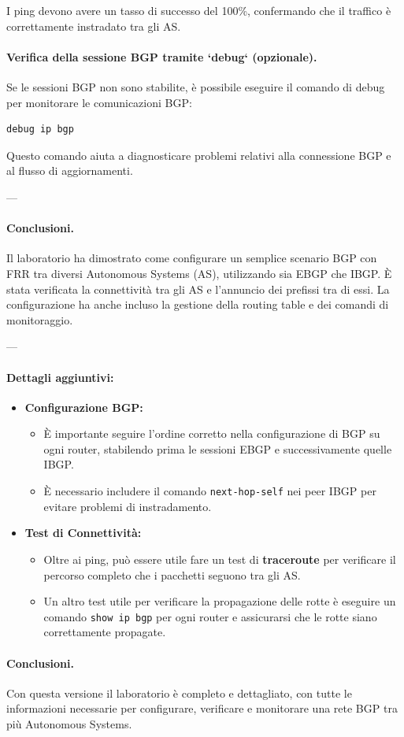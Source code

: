 I ping devono avere un tasso di successo del 100\%, confermando che il traffico è correttamente instradato tra gli AS.

\paragraph{Verifica della sessione BGP tramite `debug` (opzionale).}
Se le sessioni BGP non sono stabilite, è possibile eseguire il comando di debug per monitorare le comunicazioni BGP:
\begin{verbatim}
debug ip bgp
\end{verbatim}
Questo comando aiuta a diagnosticare problemi relativi alla connessione BGP e al flusso di aggiornamenti.

---

\paragraph{Conclusioni.}
Il laboratorio ha dimostrato come configurare un semplice scenario BGP con FRR tra diversi Autonomous Systems (AS), utilizzando sia EBGP che IBGP. È stata verificata la connettività tra gli AS e l'annuncio dei prefissi tra di essi. La configurazione ha anche incluso la gestione della routing table e dei comandi di monitoraggio.

---

\paragraph{Dettagli aggiuntivi:}
\begin{itemize}
    \item \textbf{Configurazione BGP:}
    \begin{itemize}
        \item È importante seguire l'ordine corretto nella configurazione di BGP su ogni router, stabilendo prima le sessioni EBGP e successivamente quelle IBGP.
        \item È necessario includere il comando \texttt{next-hop-self} nei peer IBGP per evitare problemi di instradamento.
    \end{itemize}

    \item \textbf{Test di Connettività:}
    \begin{itemize}
        \item Oltre ai ping, può essere utile fare un test di \textbf{traceroute} per verificare il percorso completo che i pacchetti seguono tra gli AS.
        \item Un altro test utile per verificare la propagazione delle rotte è eseguire un comando \texttt{show ip bgp} per ogni router e assicurarsi che le rotte siano correttamente propagate.
    \end{itemize}
\end{itemize}

\paragraph{Conclusioni.}
Con questa versione il laboratorio è completo e dettagliato, con tutte le informazioni necessarie per configurare, verificare e monitorare una rete BGP tra più Autonomous Systems.

